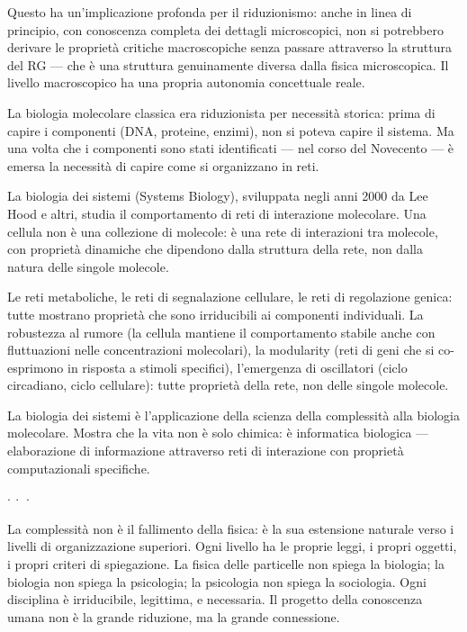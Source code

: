 \documentclass[12pt,a4paper,openany]{book}
\newcommand{\sezione}[1]{\vspace{1.2em}{\large\bfseries #1}\vspace{0.5em}\par}
\newcommand{\puntini}{\begin{center}$\cdot\ \cdot\ \cdot$\end{center}\vspace{0.3em}}
\begin{document}
Questo ha un'implicazione profonda per il riduzionismo: anche in linea di principio, con conoscenza completa dei dettagli microscopici, non si potrebbero derivare le proprietà critiche macroscopiche senza passare attraverso la struttura del RG --- che è una struttura genuinamente diversa dalla fisica microscopica. Il livello macroscopico ha una propria autonomia concettuale reale.

\sezione{La vita come rete: la biologia dei sistemi}

La biologia molecolare classica era riduzionista per necessità storica: prima di capire i componenti (DNA, proteine, enzimi), non si poteva capire il sistema. Ma una volta che i componenti sono stati identificati --- nel corso del Novecento --- è emersa la necessità di capire come si organizzano in reti.

La biologia dei sistemi (Systems Biology), sviluppata negli anni 2000 da Lee Hood e altri, studia il comportamento di reti di interazione molecolare. Una cellula non è una collezione di molecole: è una rete di interazioni tra molecole, con proprietà dinamiche che dipendono dalla struttura della rete, non dalla natura delle singole molecole.

Le reti metaboliche, le reti di segnalazione cellulare, le reti di regolazione genica: tutte mostrano proprietà che sono irriducibili ai componenti individuali. La robustezza al rumore (la cellula mantiene il comportamento stabile anche con fluttuazioni nelle concentrazioni molecolari), la modularity (reti di geni che si co-esprimono in risposta a stimoli specifici), l'emergenza di oscillatori (ciclo circadiano, ciclo cellulare): tutte proprietà della rete, non delle singole molecole.

La biologia dei sistemi è l'applicazione della scienza della complessità alla biologia molecolare. Mostra che la vita non è solo chimica: è informatica biologica --- elaborazione di informazione attraverso reti di interazione con proprietà computazionali specifiche.

\puntini

La complessità non è il fallimento della fisica: è la sua estensione naturale verso i livelli di organizzazione superiori. Ogni livello ha le proprie leggi, i propri oggetti, i propri criteri di spiegazione. La fisica delle particelle non spiega la biologia; la biologia non spiega la psicologia; la psicologia non spiega la sociologia. Ogni disciplina è irriducibile, legittima, e necessaria. Il progetto della conoscenza umana non è la grande riduzione, ma la grande connessione.
\end{document}
